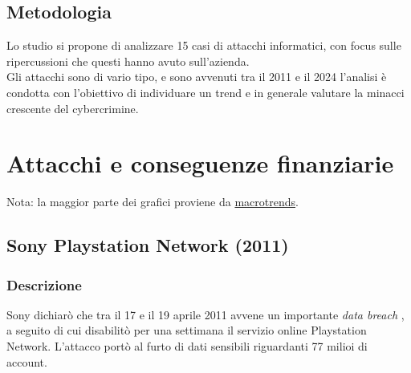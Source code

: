 \documentclass[12pt,a4paper,openright,twoside]{report}
\begin{document}
\section{Metodologia}
Lo studio si propone di analizzare 15 casi di attacchi informatici, con focus sulle ripercussioni che questi hanno avuto sull'azienda.\\
Gli attacchi sono di vario tipo, e sono avvenuti tra il 2011 e il 2024 l'analisi \`e condotta con l'obiettivo di individuare un trend e in generale valutare la minacci crescente del cybercrimine.\\  
\clearpage{\pagestyle{empty}\cleardoublepage}



\chapter{Attacchi e conseguenze finanziarie}
Nota: la maggior parte dei grafici proviene da \href{https://www.macrotrends.net/}{macrotrends}.



\section{Sony Playstation Network (2011)}
\subsection{Descrizione}
Sony dichiar\`o che tra il 17 e il 19 aprile 2011 avvene un importante \textit{data breach} , a seguito di cui disabilit\`o per una settimana il servizio online Playstation Network. L'attacco port\`o al furto di dati sensibili riguardanti 77 milioi di account\cite{Sony_PNT_guardian}\cite{Sony_pnt}.\\
\end{document}
